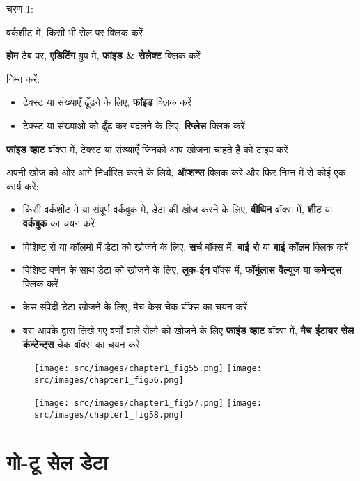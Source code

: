 \begin{descriptionSimple}{चरण 1:}
\item[चरण 1] वर्कशीट में, किसी भी सेल पर क्लिक करें
\item[चरण 2] \textbf{होम} टैब पर, \textbf{एडिटिंग} ग्रुप मे, \textbf{फांइड \& सेलेक्ट} क्लिक करें
\item[चरण 3] निम्न करें:
		\begin{itemize}	
		\item टेक्स्ट या संख्याएँ ढूँढने के लिए, \textbf{फांइड} क्लिक करें
		\item टेक्स्ट या संख्याओ को ढूँढ कर बदलने के लिए, \textbf{रिप्लेस} क्लिक करें
		\end{itemize}
\item[चरण 4] \textbf{फांइड व्हाट} बॉक्स में, टेक्स्ट या संख्याएँ जिनको आप खोजना चाहते हैं को टाइप करें
\item[चरण 5] अपनी खोज को ओर आगे निर्धारित करने के लिये, \textbf{ऑप्शन्स} क्लिक करें और फिर निम्न में से कोई एक कार्य करें:
		\begin{itemize}	
		\item किसी वर्कशीट मे या संपूर्ण वर्कवुक मे, डेटा की खोज करने के लिए, \textbf{वीथिन} बॉक्स में, \textbf{शीट} या \textbf{वर्कबुक} का चयन करें
		\item विशिष्ट रो या कॉलमो में डेटा को खोजने के लिए, \textbf{सर्च} बॉक्स में, \textbf{बाई रो} या \textbf{बाई कॉलम} क्लिक करें
		\item विशिष्ट वर्णन के साथ डेटा को खोजने के लिए, \textbf{लुक-ईन} बॉक्स में, \textbf{फॉर्मुलास वैल्यूज} या \textbf{कमेेन्ट्स} क्लिक करें
		\item केस-संवेदी डेटा खोजने के लिए, मैच केस चेक बॉक्स का चयन करें	
		\item बस आपके द्वारा लिखे गए वर्णों वाले सेलो को खोजने के लिए \textbf{फाइंड व्हाट} बॉक्स में, \textbf{मैच ईंटायर सेल कंन्टेन्ट्स} चेक बॉक्स का चयन करें
		\end{itemize}
\end{descriptionSimple}					
\begin{figure}[H]
\centering
\texttt{[image: src/images/chapter1\_fig55.png]}\qquad
\texttt{[image: src/images/chapter1\_fig56.png]}
\end{figure}
\begin{figure}[H]
\centering
\texttt{[image: src/images/chapter1\_fig57.png]}\qquad
\texttt{[image: src/images/chapter1\_fig58.png]}
\end{figure}

\section{गो-टू सेल डेटा}\label{id-1.37}

